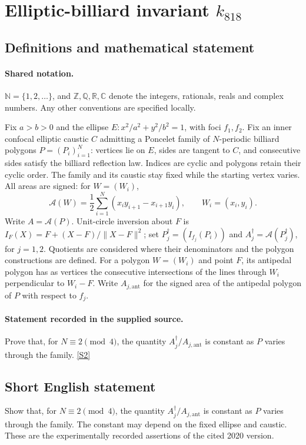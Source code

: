 \documentclass[11pt]{article}
\newcommand{\sref}[2]{\hyperlink{source:#1:#2}{[S#2]}}
\begin{document}
\section{Elliptic-billiard invariant $k_{818}$}\label{statement}

\subsection{Definitions and mathematical statement}

\paragraph{Shared notation.}$\mathbb N=\{1,2,\ldots\}$, and $\mathbb Z,\mathbb Q,\mathbb R,\mathbb C$ denote the integers, rationals, reals and complex numbers. Any other conventions are specified locally.


Fix $a>b>0$ and the ellipse $E:x^2/a^2+y^2/b^2=1$, with foci $f_1,f_2$. Fix an inner confocal elliptic caustic $C$ admitting a Poncelet family of $N$-periodic billiard polygons $P=(P_i)_{i=1}^N$: vertices lie on $E$, sides are tangent to $C$, and consecutive sides satisfy the billiard reflection law. Indices are cyclic and polygons retain their cyclic order. The family and its caustic stay fixed while the starting vertex varies. All areas are signed: for $W=(W_i)$,
\[\mathcal A(W)=\frac12\sum_{i=1}^N(x_i y_{i+1}-x_{i+1}y_i),\qquad W_i=(x_i,y_i).\]
Write $A=\mathcal A(P)$. Unit-circle inversion about $F$ is $I_F(X)=F+(X-F)/\lVert X-F\rVert^2$; set $P_j^\dagger=(I_{f_j}(P_i))$ and $A_j^\dagger=\mathcal A(P_j^\dagger)$, for $j=1,2$. Quotients are considered where their denominators and the polygon constructions are defined. For a polygon $W=(W_i)$ and point $F$, its antipedal polygon has as vertices the consecutive intersections of the lines through $W_i$ perpendicular to $W_i-F$. Write $A_{j,\mathrm{ant}}$ for the signed area of the antipedal polygon of $P$ with respect to $f_j$.
\paragraph{Statement recorded in the supplied source.}
Prove that, for $N\equiv2\pmod4$, the quantity $A_j^\dagger/A_{j,\mathrm{ant}}$ is constant as $P$ varies through the family. \sref{statement}{2}
\subsection{Short English statement}
Show that, for $N\equiv2\pmod4$, the quantity $A_j^\dagger/A_{j,\mathrm{ant}}$ is constant as $P$ varies through the family. The constant may depend on the fixed ellipse and caustic. These are the experimentally recorded assertions of the cited 2020 version.
\end{document}

